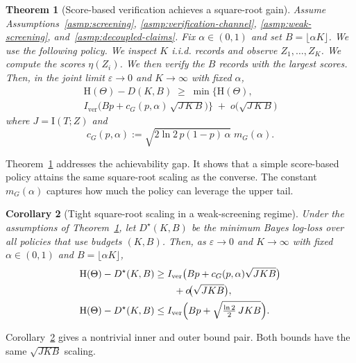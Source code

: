 \documentclass[twocolumn]{scholar7}
\newtheorem{theorem}{Theorem}
\newtheorem{corollary}[theorem]{Corollary}
\newcommand{\I}{\mathrm{I}}
\newcommand{\Hh}{\mathrm{H}}
\begin{document}
\begin{theorem}[Score-based verification achieves a square-root gain]
\label{thm:score-achievability}
Assume Assumptions~\ref{asmp:screening}, \ref{asmp:verification-channel}, \ref{asmp:weak-screening}, and~\ref{asmp:decoupled-claims}.
Fix $\alpha\in(0,1)$ and set $B=\lfloor \alpha K\rfloor$.
We use the following policy.
We inspect $K$ i.i.d. records and observe $Z_1,\dots,Z_K$.
We compute the scores $\eta(Z_i)$.
We then verify the $B$ records with the largest scores.
Then, in the joint limit $\varepsilon\to 0$ and $K\to\infty$ with fixed $\alpha$,
\begin{multline}
\label{eq:score-achievability}
\Hh(\Theta)-D(K,B)
\;\ge\;
\min\Big\{\Hh(\Theta),\\
I_{\mathrm{ver}}\big(Bp + c_G(p,\alpha)\,\sqrt{J\,K\,B}\big)\Big\}
\; +\; o\!\big(\sqrt{J\,K\,B}\big)
\end{multline}
where $J=\I(T;Z)$ and
\begin{equation}
\label{eq:cG}
c_G(p,\alpha):=\sqrt{2\ln 2\,p(1-p)\,\alpha}\;m_G(\alpha).
\end{equation}
\end{theorem}

Theorem~\ref{thm:score-achievability} addresses the achievability gap.
It shows that a simple score-based policy attains the same square-root scaling as the converse.
The constant $m_G(\alpha)$ captures how much the policy can leverage the upper tail.

\begin{corollary}[Tight square-root scaling in a weak-screening regime]
\label{cor:tight-sqrt}
Under the assumptions of Theorem~\ref{thm:score-achievability}, let $D^\star(K,B)$ be the minimum Bayes log-loss over all policies that use budgets $(K,B)$.
Then, as $\varepsilon\to 0$ and $K\to\infty$ with fixed $\alpha\in(0,1)$ and $B=\lfloor \alpha K\rfloor$,
\begin{align}
\Hh(\Theta)-D^\star(K,B)
&\ge
I_{\mathrm{ver}}\big(Bp + c_G(p,\alpha)\sqrt{J K B}\big)\notag\\
&\qquad + o\!\big(\sqrt{J K B}\big),
\label{eq:inner-sqrt}
\\
\Hh(\Theta)-D^\star(K,B)
&\le
I_{\mathrm{ver}}\Big(Bp + \sqrt{\tfrac{\ln 2}{2}\,J K B}\Big).
\label{eq:outer-sqrt}
\end{align}
\end{corollary}

Corollary~\ref{cor:tight-sqrt} gives a nontrivial inner and outer bound pair.
Both bounds have the same $\sqrt{J K B}$ scaling.
\end{document}
